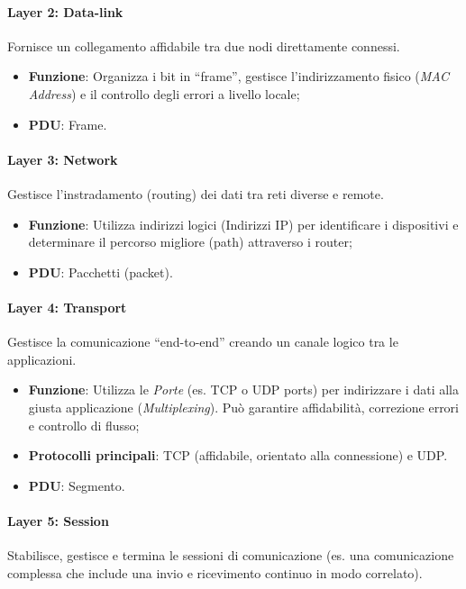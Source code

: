 %
\paragraph{Layer 2: Data-link}
Fornisce un collegamento affidabile tra due nodi direttamente connessi.
\begin{itemize}
    \item \textbf{Funzione}: Organizza i bit in ``frame'', gestisce l'indirizzamento fisico (\emph{MAC Address}) e il controllo degli errori a livello locale;
    \item \textbf{PDU}: Frame.
\end{itemize}

%
\paragraph{Layer 3: Network}
Gestisce l'instradamento (routing) dei dati tra reti diverse e remote.
\begin{itemize}
    \item \textbf{Funzione}: Utilizza indirizzi logici (Indirizzi IP) per identificare i dispositivi e determinare il percorso migliore (path) attraverso i router;
    \item \textbf{PDU}: Pacchetti (packet).
\end{itemize}

%
\paragraph{Layer 4: Transport}
Gestisce la comunicazione ``end-to-end'' creando un canale logico tra le applicazioni.
\begin{itemize}
    \item \textbf{Funzione}: Utilizza le \emph{Porte} (es. TCP o UDP ports) per indirizzare i dati alla giusta applicazione (\emph{Multiplexing}). Può garantire affidabilità, correzione errori e controllo di flusso;
    \item \textbf{Protocolli principali}: TCP (affidabile, orientato alla connessione) e UDP.
    \item \textbf{PDU}: Segmento.
\end{itemize}

%
\paragraph{Layer 5: Session}
Stabilisce, gestisce e termina le sessioni di comunicazione (es. una comunicazione complessa che include una invio e ricevimento continuo in modo correlato).

